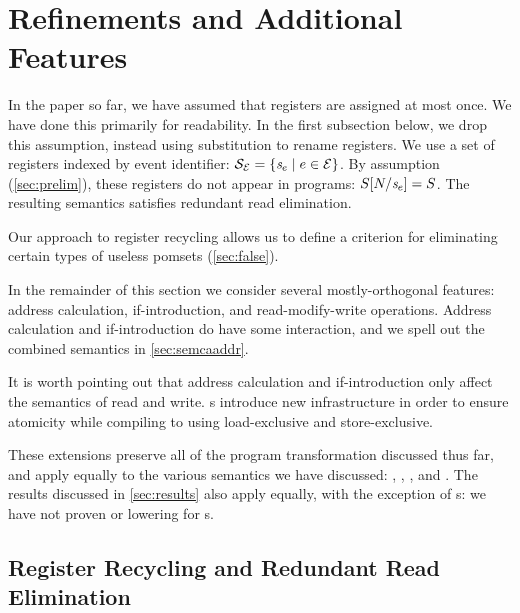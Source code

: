 
\section{Refinements and Additional Features} %
\label{sec:additional}

In the paper so far, we have assumed that registers are assigned at most
once.  We have done this primarily for readability.  In the first subsection
below, we drop this assumption, instead using substitution to rename
registers.  We use a set of registers indexed by event identifier:
$\mathcal{S}_{\mathcal{E}}=\{\mathit{s}_{e}\mid e\in\mathcal{E}\}$.  By assumption
(\textsection\ref{sec:prelim}), these registers do not appear in programs:
$S[N/\mathit{s}_{e}]=S$.  The resulting semantics satisfies
redundant read elimination.

Our approach to register recycling allows us to define a criterion for
eliminating certain types of useless pomsets (\textsection\ref{sec:false}).

In the remainder of this section we consider several mostly-orthogonal features: address
calculation, if-introduction, and read-modify-write operations.  Address
calculation and if-introduction do have some interaction, and we spell out the
combined semantics in \textsection\ref{sec:semcaaddr}.

It is worth pointing out that address calculation and if-introduction only affect
the semantics of read and write.  
\RMW{}s introduce new infrastructure in order to ensure atomicity while
compiling to \armeight{} using load-exclusive and store-exclusive.

These extensions preserve all of the program transformation discussed thus
far, and apply equally to the various semantics we have discussed: \PwT{},
, , and \PwTc{}.  The results discussed in
\textsection\ref{sec:results} also apply equally, with the exception of
\RMW{}s: we have not proven \drfsc{} or \armeight{} lowering for \RMW{}s.


\subsection{Register Recycling and Redundant Read Elimination}
\label{sec:semreg}

